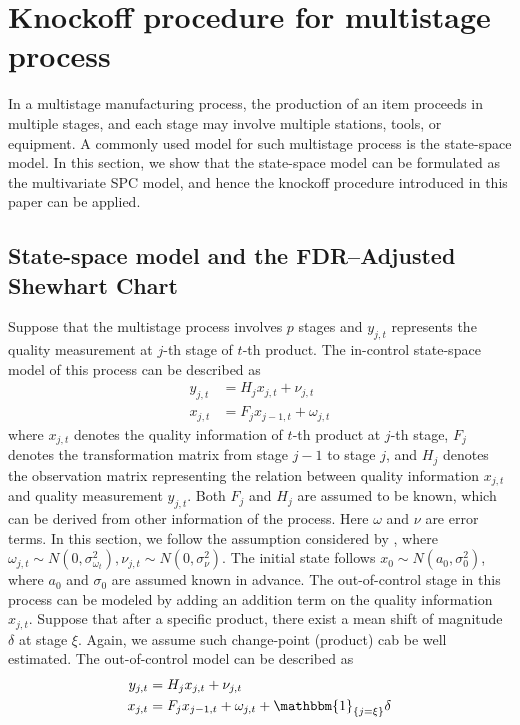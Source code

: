 \documentclass[]{interact}
\theoremstyle{plain}%
\theoremstyle{definition}
\theoremstyle{remark}
\begin{document}
\section{Knockoff procedure for multistage process}
In a multistage manufacturing process, the production of an item proceeds in multiple stages, and each stage may involve multiple stations, tools, or equipment. A commonly used model for such multistage process is the state-space model. In this section, we show that the state-space model can be formulated as the multivariate SPC model, and hence the knockoff procedure introduced in this paper can be applied. 

\subsection{State-space model and the FDR–Adjusted Shewhart Chart}
Suppose that the multistage process involves $p$ stages and $y_{j,t}$ represents the quality measurement at $j$-th stage of $t$-th product. The in-control state-space model of this process can be described as
\begin{equation}\label{incontrol}
\begin{split}
y_{j,t} &= H_j x_{j,t} + \nu_{j,t} \\
x_{j,t} &= F_j x_{j-1,t} + \omega_{j,t}
\end{split}
\end{equation}
where $x_{j,t}$ denotes the quality information of $t$-th product at $j$-th stage, $ F_j$ denotes the transformation matrix from stage $j-1$ to stage $j$, and $ H_j$ denotes the observation matrix representing the relation between quality information $x_{j,t}$ and quality measurement $y_{j,t}$. Both $F_j$ and $H_j$ are assumed to be known, which can be derived from other information of the process. Here $\omega$ and $\nu$ are error terms. In this section, we follow the assumption considered by \cite{xiang2008statistical}, where $\omega_{j,t} \sim N(0, \sigma^2_{\omega_t}), \nu_{j,t} \sim N(0,\sigma^2_\nu)$. The initial state follows $x_0 \sim N(a_0, \sigma_0^2)$, where $a_0$ and $\sigma_0$ are assumed known in advance. The out-of-control stage in this process can be modeled by adding an addition term on the quality information $x_{j,t}$. Suppose that after a specific product, there exist a mean shift of magnitude $\delta$ at stage $\xi$. Again, we assume such change-point (product) cab be well estimated. The out-of-control model can be described as 
\begin{equation}\label{outcontrol}
\begin{split}
y_{j,t} &= H_j x_{j,t} + \nu_{j,t} \\
x_{j,t} &= F_j x_{j-1,t} + \omega_{j,t} + \mathbbm{1}_{\{j=\xi\}} \delta
\end{split}
\end{equation}
\end{document}
